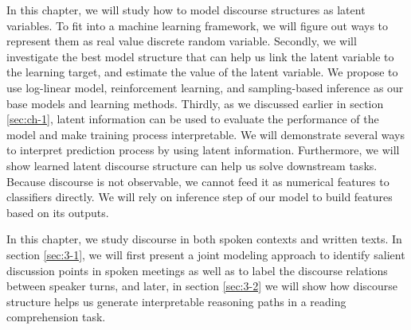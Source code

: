 In this chapter, we will study how to model discourse structures as latent variables. To fit into a machine learning framework, we will figure out ways to represent them as real value discrete random variable. Secondly, we will investigate the best model structure that can help us link the latent variable to the learning target, and estimate the value of the latent variable. We propose to use log-linear model, reinforcement learning, and sampling-based inference as our base models and learning methods. Thirdly, as we discussed earlier in section \ref{sec:ch-1}, latent information can be used to evaluate the performance of the model and make training process interpretable. We will demonstrate several ways to interpret prediction process by using latent information. Furthermore, we will show learned latent discourse structure can help us solve downstream tasks. Because discourse is not observable, we cannot feed it as numerical features to classifiers directly. We will rely on inference step of our model to build features based on its outputs.

In this chapter, we study discourse in both spoken contexts and written texts. In section \ref{sec:3-1}, we will first present a joint modeling approach to identify salient discussion points in spoken meetings as well as to label the discourse relations between speaker turns, and later, in section \ref{sec:3-2} we will show how discourse structure helps us generate interpretable reasoning paths in a reading comprehension task.
